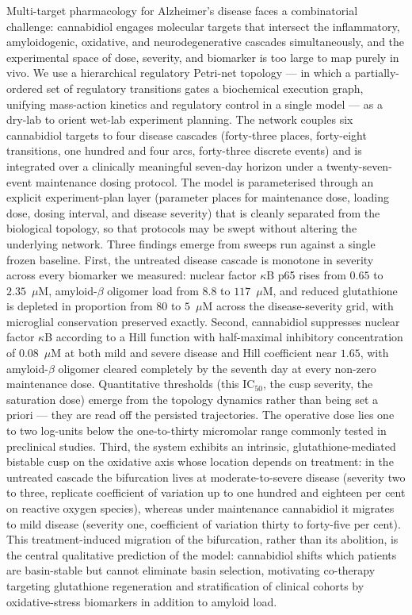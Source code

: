 \documentclass[10pt,letterpaper]{article}
\begin{document}
Multi-target pharmacology for Alzheimer's disease faces a combinatorial challenge: cannabidiol engages molecular targets that intersect the inflammatory, amyloidogenic, oxidative, and neurodegenerative cascades simultaneously, and the experimental space of dose, severity, and biomarker is too large to map purely in vivo. We use a hierarchical regulatory Petri-net topology --- in which a partially-ordered set of regulatory transitions gates a biochemical execution graph, unifying mass-action kinetics and regulatory control in a single model --- as a dry-lab to orient wet-lab experiment planning. The network couples six cannabidiol targets to four disease cascades (forty-three places, forty-eight transitions, one hundred and four arcs, forty-three discrete events) and is integrated over a clinically meaningful seven-day horizon under a twenty-seven-event maintenance dosing protocol. The model is parameterised through an explicit experiment-plan layer (parameter places for maintenance dose, loading dose, dosing interval, and disease severity) that is cleanly separated from the biological topology, so that protocols may be swept without altering the underlying network. Three findings emerge from sweeps run against a single frozen baseline. First, the untreated disease cascade is monotone in severity across every biomarker we measured: nuclear factor $\kappa$B p65 rises from $0.65$ to $2.35$~$\mu$M, amyloid-$\beta$ oligomer load from $8.8$ to $117$~$\mu$M, and reduced glutathione is depleted in proportion from $80$ to $5$~$\mu$M across the disease-severity grid, with microglial conservation preserved exactly. Second, cannabidiol suppresses nuclear factor $\kappa$B according to a Hill function with half-maximal inhibitory concentration of $0.08$~$\mu$M at both mild and severe disease and Hill coefficient near $1.65$, with amyloid-$\beta$ oligomer cleared completely by the seventh day at every non-zero maintenance dose. Quantitative thresholds (this IC$_{50}$, the cusp severity, the saturation dose) emerge from the topology dynamics rather than being set a priori --- they are read off the persisted trajectories. The operative dose lies one to two log-units below the one-to-thirty micromolar range commonly tested in preclinical studies. Third, the system exhibits an intrinsic, glutathione-mediated bistable cusp on the oxidative axis whose location depends on treatment: in the untreated cascade the bifurcation lives at moderate-to-severe disease (severity two to three, replicate coefficient of variation up to one hundred and eighteen per cent on reactive oxygen species), whereas under maintenance cannabidiol it migrates to mild disease (severity one, coefficient of variation thirty to forty-five per cent). This treatment-induced migration of the bifurcation, rather than its abolition, is the central qualitative prediction of the model: cannabidiol shifts which patients are basin-stable but cannot eliminate basin selection, motivating co-therapy targeting glutathione regeneration and stratification of clinical cohorts by oxidative-stress biomarkers in addition to amyloid load.
\end{document}
